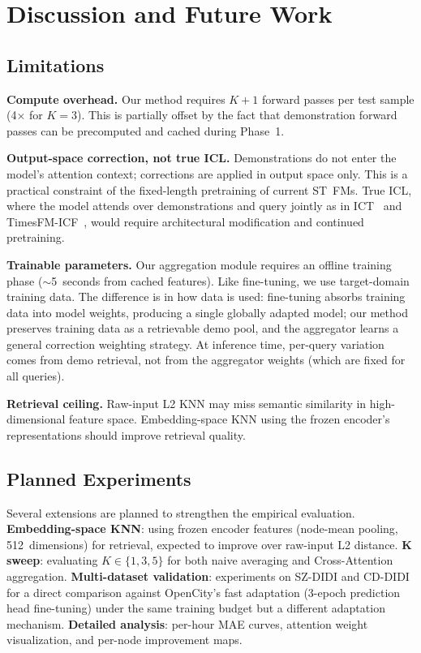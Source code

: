 \documentclass[conference]{IEEEtran}
\begin{document}
\section{Discussion and Future Work}

\subsection{Limitations}

\textbf{Compute overhead.}
Our method requires $K{+}1$ forward passes per test sample (4$\times$ for $K{=}3$).
This is partially offset by the fact that demonstration forward passes can be precomputed and cached during Phase~1.

\textbf{Output-space correction, not true ICL.}
Demonstrations do not enter the model's attention context; corrections are applied in output space only.
This is a practical constraint of the fixed-length pretraining of current ST~FMs.
True ICL, where the model attends over demonstrations and query jointly as in ICT~\cite{chen2022ict} and TimesFM-ICF~\cite{das2024icf}, would require architectural modification and continued pretraining.

\textbf{Trainable parameters.}
Our aggregation module requires an offline training phase (${\sim}$5~seconds from cached features).
Like fine-tuning, we use target-domain training data.
The difference is in how data is used: fine-tuning absorbs training data into model weights, producing a single globally adapted model; our method preserves training data as a retrievable demo pool, and the aggregator learns a general correction weighting strategy.
At inference time, per-query variation comes from demo retrieval, not from the aggregator weights (which are fixed for all queries).

\textbf{Retrieval ceiling.}
Raw-input L2 KNN may miss semantic similarity in high-dimensional feature space.
Embedding-space KNN using the frozen encoder's representations should improve retrieval quality.

\subsection{Planned Experiments}

Several extensions are planned to strengthen the empirical evaluation.
\textbf{Embedding-space KNN}: using frozen encoder features (node-mean pooling, 512~dimensions) for retrieval, expected to improve over raw-input L2 distance.
\textbf{K sweep}: evaluating $K \in \{1, 3, 5\}$ for both naive averaging and Cross-Attention aggregation.
\textbf{Multi-dataset validation}: experiments on SZ-DIDI and CD-DIDI for a direct comparison against OpenCity's fast adaptation (3-epoch prediction head fine-tuning) under the same training budget but a different adaptation mechanism.
\textbf{Detailed analysis}: per-hour MAE curves, attention weight visualization, and per-node improvement maps.
\end{document}
